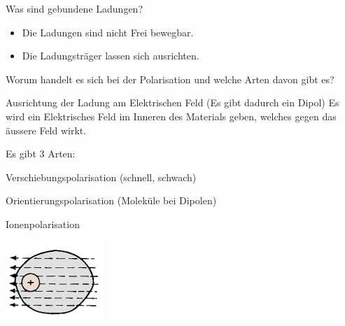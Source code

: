 \begin{lk}{Was sind gebundene Ladungen?}
	\begin{itemize}
		\item Die Ladungen sind nicht Frei bewegbar.
		\item Die Ladungsträger lassen sich ausrichten.
	\end{itemize}
\end{lk}

\begin{lk}{Worum handelt es sich bei der Polarisation und welche Arten davon gibt es?}
	\begin{compactitem}
		\item Ausrichtung der Ladung am Elektrischen Feld (Es gibt dadurch ein Dipol) Es wird ein Elektrisches Feld im Inneren des Materials geben, welches gegen das äussere Feld wirkt.
		\item Es gibt 3 Arten:
		\begin{compactitem}
			\item Verschiebungspolarisation (schnell, schwach)
			\item Orientierungspolarisation (Moleküle bei Dipolen)
			\item Ionenpolarisation
		\end{compactitem}
	\end{compactitem} 
	\begin{center}
		\begin{minipage}{0.18\textwidth}
			\includegraphics[width=\textwidth]{pics/ES_Ausrichtungspolarisation.png}\\

\end{minipage}
\end{center}
\end{lk}
